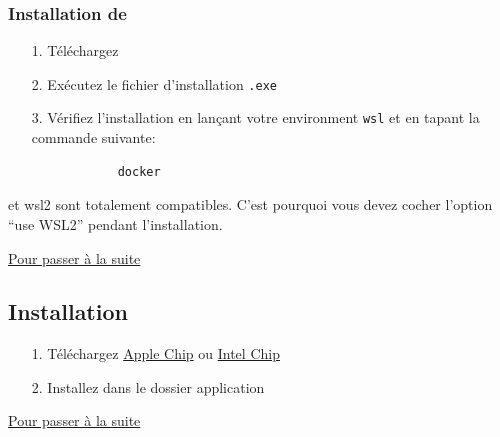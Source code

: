     \subsubsection[Installation de Docker Desktop]{Installation de \dockerdesktop}
    
    \begin{itemize}
        \item[1.] Téléchargez \href{https://desktop.docker.com/win/main/amd64/Docker%20Desktop%20Installer.exe}{\dockerdesktop{}}
        
        \item[2.] Exécutez le fichier d'installation \verb|.exe|
        
        \item[3.] Vérifiez l'installation en lançant votre environment \verb|wsl| et en tapant la commande suivante:
        \begin{lstlisting}
            docker
        \end{lstlisting}
    \end{itemize}

    \docker{} et wsl2 sont totalement compatibles. C'est pourquoi vous devez cocher l'option ``use WSL2'' pendant l'installation. 

    \hyperref[sec:suite]{Pour passer à la suite}

\newpage
\subsection[Installation MacOS]{Installation \macos{}\label{sec:installation_macos}}

    \begin{itemize}
        \item[1.] Téléchargez \dockerdesktop{} \href{https://desktop.docker.com/mac/main/arm64/Docker.dmg?utm_source=docker&utm_medium=webreferral&utm_campaign=dd-smartbutton&utm_location=module}{Apple Chip} ou \href{https://desktop.docker.com/mac/main/amd64/Docker.dmg?utm_source=docker&utm_medium=webreferral&utm_campaign=dd-smartbutton&utm_location=module}{Intel Chip}
        \item[2.] Installez \dockerdesktop{} dans le dossier application
    \end{itemize}

    \hyperref[sec:suite]{Pour passer à la suite}

\newpage

